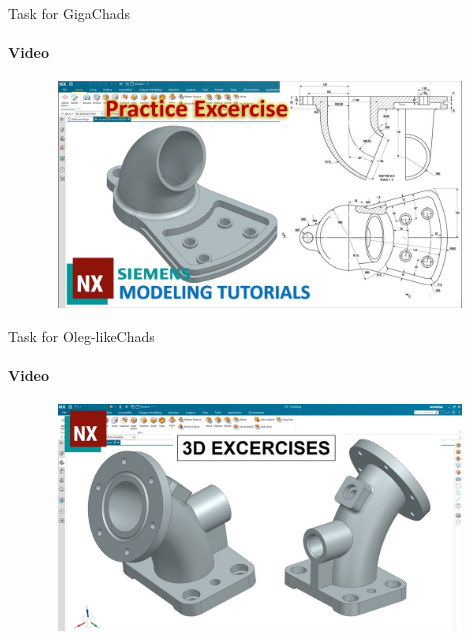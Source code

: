 \documentclass[aspectratio=169]{beamer}
\begin{document}
\begin{frame}[t]{Task for GigaChads}
    \framesubtitle{Video}
    \vspace{-0.6cm}
    \begin{figure}[H]
        \href{https://youtu.be/zxm297gENnU}{
            \centering\includegraphics[height=6cm,width=1\textwidth,keepaspectratio]{gigachad.jpg}}
        \label{fig:gigachad.jpg}
    \end{figure}
\end{frame}

\begin{frame}[t]{Task for Oleg-likeChads}
    \framesubtitle{Video}
    \vspace{-0.6cm}
    \begin{figure}[H]
        \href{https://youtu.be/Q0JvkLUzkpU}{
            \centering\includegraphics[height=6cm,width=1\textwidth,keepaspectratio]{olegchad.jpg}}
        \label{fig:olegchad.jpg}
    \end{figure}
\end{frame}
\end{document}
